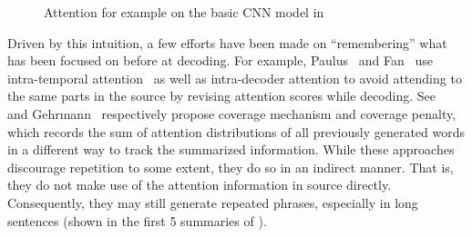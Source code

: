 \begin{figure}[th!]
\centering
{}
\quad
{}
\quad
{}
\caption{Attention for example on the basic CNN model in }
\label{fig:attn_map}
\end{figure}

Driven by this intuition, a few efforts have been made on ``remembering''
what has been focused on before at decoding. 
For example, 
Paulus~\cite{PaulusXS17} and 
Fan~\cite{FanGA18} use intra-temporal 
attention~\cite{NallapatiZSGX16} as well as intra-decoder attention to avoid
attending to the same parts in the source by 
revising attention scores while decoding. 
See~\cite{SeeLM17} and Gehrmann~\cite{GehrmannDR18}
respectively propose coverage mechanism and coverage penalty,
which records the sum of attention distributions of all previously generated words 
in a different way to track the summarized information.  
While these approaches discourage repetition to some extent,
they do so in an indirect manner. That is, they do not 
make use of the attention information in source directly.
Consequently, they may still generate repeated phrases, 
especially in long sentences (shown in the first 5 summaries of
).


